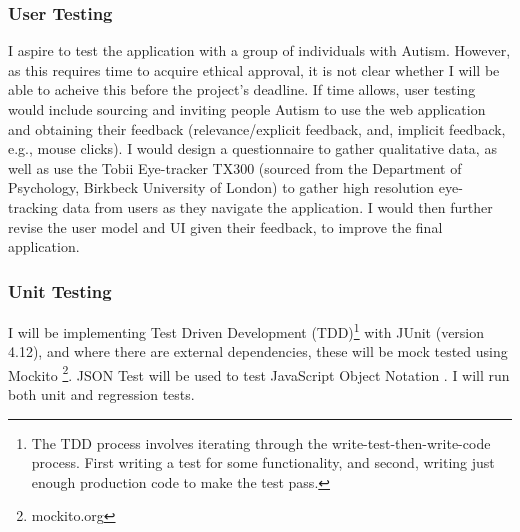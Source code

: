 \documentclass[a4paper, 10pt]{article}
\begin{document}
\subsubsection{User Testing}
I aspire to test the application with a group of individuals with Autism. However, as this requires time to acquire ethical approval, it is not clear whether I will be able to acheive this before the project's deadline. If time allows, user testing would include sourcing and inviting people Autism to use the web application and obtaining their feedback (relevance/explicit feedback, and, implicit feedback, e.g., mouse clicks). I would design a questionnaire to gather qualitative data, as well as use the Tobii Eye-tracker TX300 (sourced from the Department of Psychology, Birkbeck University of London) to gather high resolution eye-tracking data from users as they navigate the application. I would then further revise the user model and UI given their feedback, to improve the final application.

\subsubsection{Unit Testing}
I will be implementing Test Driven Development (TDD)\footnote{The TDD process involves iterating through the write-test-then-write-code process. First writing a test for some functionality, and second, writing just enough production code to make the test pass.} with JUnit (version 4.12), and where there are external dependencies, these will be mock tested using Mockito \footnote{mockito.org}. JSON Test will be used to test JavaScript Object Notation \cite{jsontest}. I will run both unit and regression tests.
\end{document}
